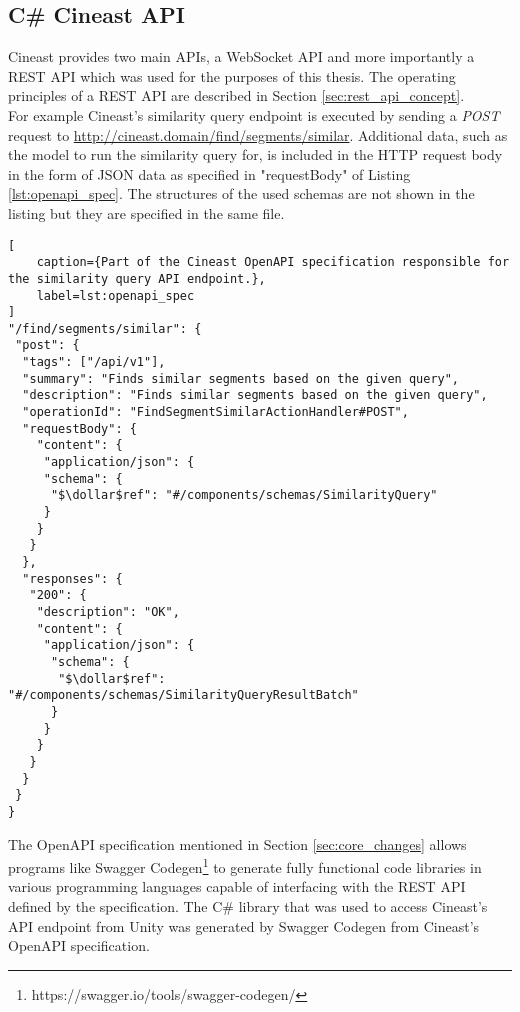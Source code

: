\subsection{C\# Cineast API}
\label{sec:rest_api}

Cineast provides two main APIs, a WebSocket API and more importantly a REST API which was used for the purposes of this thesis. The operating principles of a REST API are described in Section \ref{sec:rest_api_concept}.\\
For example Cineast's similarity query endpoint is executed by sending a \textit{POST} request to \url{http://cineast.domain/find/segments/similar}. Additional data, such as the model to run the similarity query for, is included in the HTTP request body in the form of JSON data as specified in "requestBody" of Listing \ref{lst:openapi_spec}. The structures of the used schemas are not shown in the listing but they are specified in the same file.

\begin{mdframed}[
	backgroundcolor=light-gray,
	roundcorner=10pt,
	leftmargin=1,
	rightmargin=1,
	innerleftmargin=25,
	innertopmargin=0,
	innerbottommargin=0,
	outerlinewidth=1,
	linecolor=light-gray
]
\lstset{style=json}
\begin{lstlisting}[
	caption={Part of the Cineast OpenAPI specification responsible for the similarity query API endpoint.},
	label=lst:openapi_spec
]
"/find/segments/similar": {
 "post": {
  "tags": ["/api/v1"],
  "summary": "Finds similar segments based on the given query",
  "description": "Finds similar segments based on the given query",
  "operationId": "FindSegmentSimilarActionHandler#POST",
  "requestBody": {
    "content": {
     "application/json": {
     "schema": {
      "$\dollar$ref": "#/components/schemas/SimilarityQuery"
     }
    }
   }
  },
  "responses": {
   "200": {
    "description": "OK",
    "content": {
     "application/json": {
      "schema": {
       "$\dollar$ref": "#/components/schemas/SimilarityQueryResultBatch"
      }
     }
    }
   }
  }
 }
}
\end{lstlisting}
\end{mdframed}

The OpenAPI specification mentioned in Section \ref{sec:core_changes} allows programs like Swagger Codegen\footnote{https://swagger.io/tools/swagger-codegen/} to generate fully functional code libraries in various programming languages capable of interfacing with the REST API defined by the specification. The C\# library that was used to access Cineast's API endpoint from Unity was generated by Swagger Codegen from Cineast's OpenAPI specification.

